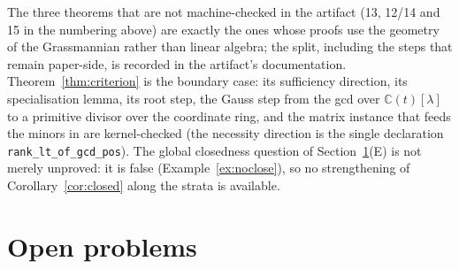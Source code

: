 \documentclass[journal]{IEEEtran}
\theoremstyle{plainn}
\theoremstyle{remark}
\begin{document}
The three theorems that are not machine-checked in the artifact (13, 12/14 and 15 in the numbering
above) are exactly the ones whose proofs use the geometry of the Grassmannian rather than linear
algebra; the split, including the steps that remain paper-side, is recorded in the artifact's
documentation. Theorem~\ref{thm:criterion} is the boundary case: its sufficiency direction, its
specialisation lemma, its root step, the Gauss step from the gcd over $\mathbb C(t)[\lambda]$ to a
primitive divisor over the coordinate ring, and the matrix instance that feeds the minors in are
kernel-checked (the necessity direction is the single declaration
\texttt{rank\_lt\_of\_gcd\_pos}). The global
closedness question of Section~\ref{sec:open}(E) is not merely unproved:
it is false (Example~\ref{ex:noclose}), so no strengthening of Corollary~\ref{cor:closed} along the
strata is available.

\section{Open problems}\label{sec:open}
\end{document}
